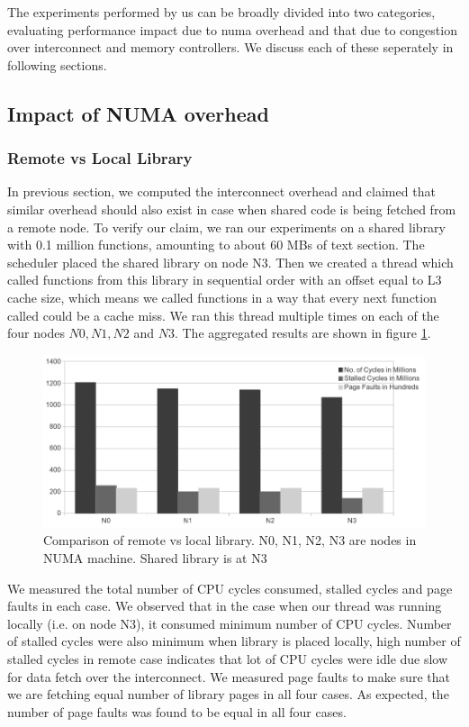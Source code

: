
The experiments performed by us can be broadly divided into two categories, evaluating performance
impact due to numa overhead and that due to congestion over interconnect and memory controllers.
We discuss each of these seperately in following sections.
\subsection{Impact of NUMA overhead}

\subsubsection{Remote vs Local Library} \label{sec:remoteVsLocal}
In previous section, we computed the interconnect overhead and claimed that similar overhead should 
also exist in case when shared code is being fetched from a remote node.
To verify our claim, we ran our experiments on a shared library with 0.1 million functions, amounting to
about 60 MBs of text section. The scheduler placed the shared library on node N3.
Then we created a thread which called functions from this library in sequential order with an offset equal to 
L3 cache size, which means we called functions in a way that every next function called could be a cache miss.
We ran this thread multiple times on each of the four nodes $N0, N1, N2$ and $N3$.
The aggregated results are shown in figure \ref{fig:remoteVsLocal}.

\begin{figure}
    \centering
    \includegraphics[scale=0.38]{remoteVsLocal.png}
    \caption{Comparison of remote vs local library. N0, N1, N2, N3 are nodes in NUMA machine. Shared library is at N3 }
    \label{fig:remoteVsLocal}
\end{figure}

We measured the total number of CPU cycles consumed, stalled cycles and page faults in each case.
We observed that in the case when our thread was running locally (i.e. on node N3), it consumed minimum number of CPU cycles.
Number of stalled cycles were also minimum when library is placed locally, high number of stalled cycles in remote case indicates
that lot of CPU cycles were idle due slow for data fetch over the interconnect.
We measured page faults to make sure that we are fetching equal number of library pages in all four cases.
As expected, the number of page faults was found to be equal in all four cases.

